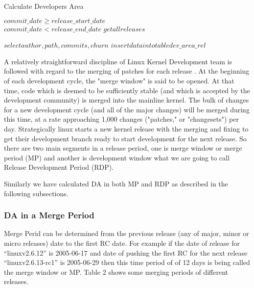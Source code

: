 \documentclass{acm_proc_article-sp}
\begin{document}
\begin{algorithm}
\caption{Calculate Developers Area}
\begin{algorithmic}
\REQUIRE $ $\\
$commit\_date \geq  release\_start\_date$\\
$commit\_date < release\_end\_date$
\ENSURE
\STATE $get all releases$

		\STATE $select author, path, commits, churn$
		\STATE $insert data into table dev\_area\_rel$
	\ENDIF
\ENDIF
\ENDWHILE
\end{algorithmic}
\end{algorithm}

A relatively straightforward discipline of Linux Kernel Development team is followed with regard to the merging of patches for each release \cite{14_kernel}.  At the beginning of each development cycle, the "merge window" is said to be opened.  At that time, code which is deemed to be sufficiently stable (and which is accepted by the development community) is merged into the mainline kernel. The bulk of changes for a new development cycle (and all of the major changes) will be merged during this time, at a rate approaching 1,000 changes ("patches," or "changesets") per day. Strategically linux starts a new kernel release with the merging and fixing to get their development branch ready to start development for the next release. So there are two main segments in a release period, one is merge window or merge period (MP) and another is development window what we are going to call Release Development Period (RDP).

Similarly we have calculated DA in both MP and RDP as described in the following subsections.

\subsubsection{DA in a Merge Period}
Merge Perid can be determined from the previous release (any of major, minor or micro releases) date to the first RC date. For example if the date of release for ``linuxv2.6.12''  is 2005-06-17 and date of pushing the first RC for the next release ``linuxv2.6.13-rc1'' is 2005-06-29 then this time period of of 12 days is being called the merge window \cite{14_kernel} or MP. Table 2 shows some merging periods of different releases.
\end{document}
